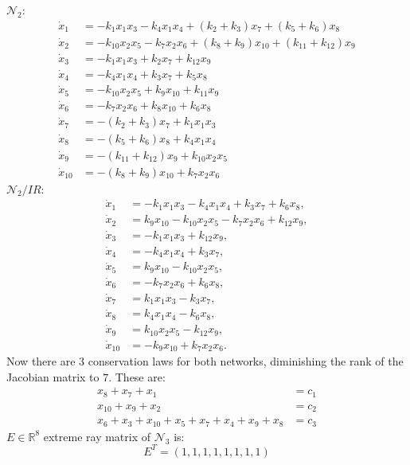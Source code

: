 $\mathcal{N}_2$:
\[
	\begin{aligned}
		\dot{x}_1&=-k_{1}x_{1}x_{3}-k_{4}x_{1}x_{4}+(k_{2}+k_{3})x_{7}+(k_{5}+k_{6})x_{8}\\\dot{x}_2&=-k_{10}x_{2}x_{5}-k_{7}x_{2}x_{6}+(k_{8}+k_{9})x_{10}+(k_{11}+k_{12})x_{9}\\\dot{x}_3&=-k_1x_1x_3+k_2x_7+k_{12}x_9\\\dot{x}_4&=-k_4x_1x_4+k_3x_7+k_5x_8\\\dot{x}_5&=-k_{10}x_2x_5+k_9x_{10}+k_{11}x_9\\\dot{x}_6&=-k_7x_2x_6+k_8x_{10}+k_6x_8\\\dot{x}_7&=-(k_2+k_3)x_7+k_1x_1x_3\\\dot{x}_8&=-(k_5+k_6)x_8+k_4x_1x_4\\\dot{x}_9&=-(k_{11}+k_{12})x_9+k_{10}x_2x_5\\\dot{x}_{10}&=-(k_8+k_9)x_{10}+k_7x_2x_6
	\end{aligned}
\]
$\mathcal{N}_2 / IR$:
\[
	\begin{aligned}
		\dot{x}_{1} &= -k_{1} x_{1} x_{3} - k_{4} x_{1} x_{4} + k_{3} x_{7} + k_{6} x_{8},\\
		\dot{x}_{2} &= k_{9} x_{10} - k_{10} x_{2} x_{5} - k_{7} x_{2} x_{6} + k_{12} x_{9},\\
		\dot{x}_{3} &= -k_{1} x_{1} x_{3} + k_{12} x_{9},\\
		\dot{x}_{4} &= -k_{4} x_{1} x_{4} + k_{3} x_{7},\\
		\dot{x}_{5} &= k_{9} x_{10} - k_{10} x_{2} x_{5},\\
		\dot{x}_{6} &= -k_{7} x_{2} x_{6} + k_{6} x_{8},\\
		\dot{x}_{7} &= k_{1} x_{1} x_{3} - k_{3} x_{7},\\
		\dot{x}_{8} &= k_{4} x_{1} x_{4} - k_{6} x_{8},\\
		\dot{x}_{9} &= k_{10} x_{2} x_{5} - k_{12} x_{9},\\
		\dot{x}_{10} &= -k_{9} x_{10} + k_{7} x_{2} x_{6}.
	\end{aligned}
\]
Now there are 3 conservation laws for both networks, diminishing the rank of the Jacobian matrix to $7$. These are:
\[
	\begin{aligned}
		x_{8}+x_{7}+x_{1} &=c_{1}\\
		x_{10}+x_{9}+x_{2}&=c_{2}\\
		x_6 + x_3 + x_{ 10 } + x_5 + x_7 + x_4 + x_9 + x_8 &= c_3
	\end{aligned}
\]
$E \in \mathbb{R}^8$ extreme ray matrix of $\mathcal{N}_3$ is:
\begin{equation}\label{e_matix_net3}
	E^T=(1,1,1,1,1,1,1,1)
\end{equation}
